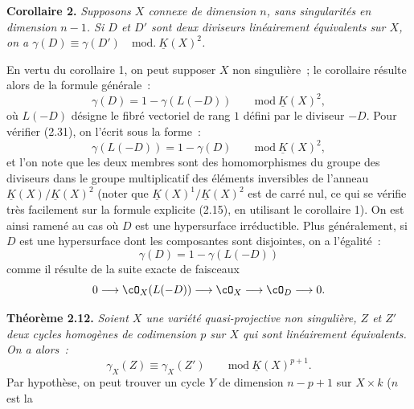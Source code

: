\textbf{Corollaire 2.} \emph{Supposons $X$ connexe de dimension $n$, sans singularités en dimension $n-1$. Si $D$ et $D'$ sont deux diviseurs linéairement équivalents sur $X$, on a $\gamma(D)\equiv\gamma(D')\quad\mathrm{mod.}\ \underline K(X)^2$.}

En vertu du corollaire 1, on peut supposer $X$ non singulière~; le corollaire résulte alors de la formule générale~:
\begin{equation}\tag{2.31}
 \gamma(D)=1-\gamma(L(-D))\qquad\mathrm{mod}\ \underline K(X)^2,
\end{equation}
où $L(-D)$ désigne le fibré vectoriel de rang $1$ défini par le diviseur $-D$. Pour vérifier (2.31), on l'écrit sous la forme~:
\begin{equation}\tag{2.31 bis}
 \gamma(L(-D))=1-\gamma(D)\qquad\mathrm{mod}\ \underline K(X)^2,
\end{equation}
et l'on note que les deux membres sont des homomorphismes du groupe des diviseurs dans le groupe multiplicatif des éléments inversibles de l'anneau $\underline K(X)/\underline K(X)^2$ (noter que $\underline K(X)^1/\underline K(X)^2$ est de carré nul, ce qui se vérifie très facilement sur la formule explicite (2.15), en utilisant le corollaire 1). On est ainsi ramené au cas où $D$ est une hypersurface irréductible. Plus généralement, si $D$ est une hypersurface dont les composantes sont disjointes, on a l'égalité~:
\begin{equation}\tag{2.32}
 \gamma(D)=1-\gamma(L(-D))
\end{equation}
comme il résulte de la suite exacte de faisceaux
\[
0\longrightarrow\cO_X(L(-D))\longrightarrow\cO_X\longrightarrow\cO_D\longrightarrow0.
\]

\textbf{Théorème 2.12.} \emph{Soient $X$ une variété quasi-projective non singulière, $Z$ et $Z'$ deux cycles homogènes de codimension $p$ sur $X$ qui sont linéairement équivalents. On a alors~:}
\begin{equation}\tag{2.33}
 \gamma_X(Z)\equiv\gamma_X(Z')\qquad\mathrm{mod}\ \underline K(X)^{p+1}.
\end{equation}
Par hypothèse, on peut trouver un cycle $Y$ de dimension $n-p+1$ sur $X\times k$ ($n$ est la
